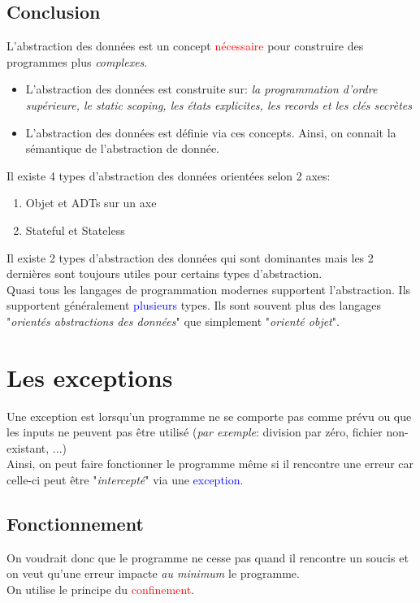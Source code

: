 \documentclass{report}
\begin{document}
\section{Conclusion}
\noindent
L'abstraction des données est un concept \textcolor{red}{nécessaire} pour construire des programmes plus \textit{complexes}.
\begin{itemize}
\item L'abstraction des données est construite sur: \textit{la programmation d'ordre supérieure, le static scoping, les états explicites, les records et les clés secrètes}
\item L'abstraction des données est définie via ces concepts. Ainsi, on connait la sémantique de l'abstraction de donnée.
\end{itemize} 
Il existe 4 types d'abstraction des données orientées selon 2 axes: 
\begin{enumerate}
\item Objet et ADTs sur un axe
\item Stateful et Stateless
\end{enumerate} 
Il existe 2 types d'abstraction des données qui sont dominantes mais les 2 dernières sont toujours utiles pour certains types d'abstraction.\\
Quasi tous les langages de programmation modernes supportent l'abstraction. Ils supportent généralement \textcolor{blue}{plusieurs} types. Ils sont souvent plus des langages "\textit{orientés abstractions des données}" que simplement "\textit{orienté objet}".


\chapter{Les exceptions}
Une exception est lorsqu'un programme ne se comporte pas comme prévu ou que les inputs ne peuvent pas être utilisé (\textit{par exemple}: division par zéro, fichier non-existant, ...)\\
Ainsi, on peut faire fonctionner le programme même si il rencontre une erreur car celle-ci peut être "\textit{intercepté}" via une \textcolor{blue}{exception}.

\section{Fonctionnement}
On voudrait donc que le programme ne cesse pas quand il rencontre un soucis et on veut qu'une erreur impacte \textit{au minimum} le programme.\\
On utilise le principe du \textcolor{red}{confinement}.
\end{document}
